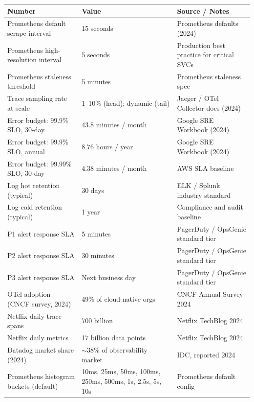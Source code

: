 \documentclass[11pt,a4paper]{article}
\begin{document}
\begin{center}
\small
\begin{tabularx}{\textwidth}{@{}lXX@{}}
\toprule
\textbf{Number} & \textbf{Value} & \textbf{Source / Notes} \\ \midrule
Prometheus default scrape interval       & 15 seconds                           & Prometheus defaults (2024)                \\
Prometheus high-resolution interval      & 5 seconds                            & Production best practice for critical SVCs \\
Prometheus staleness threshold           & 5 minutes                            & Prometheus staleness spec                 \\
Trace sampling rate at scale             & 1--10\% (head); dynamic (tail)       & Jaeger / OTel Collector docs (2024)       \\
Error budget: 99.9\% SLO, 30-day        & 43.8 minutes / month                 & Google SRE Workbook (2024)                \\
Error budget: 99.9\% SLO, annual        & 8.76 hours / year                    & Google SRE Workbook (2024)                \\
Error budget: 99.99\% SLO, 30-day       & 4.38 minutes / month                 & AWS SLA baseline                          \\
Log hot retention (typical)             & 30 days                              & ELK / Splunk industry standard            \\
Log cold retention (typical)            & 1 year                               & Compliance and audit baseline             \\
P1 alert response SLA                   & 5 minutes                            & PagerDuty / OpsGenie standard tier        \\
P2 alert response SLA                   & 30 minutes                           & PagerDuty / OpsGenie standard tier        \\
P3 alert response SLA                   & Next business day                    & PagerDuty / OpsGenie standard tier        \\
OTel adoption (CNCF survey, 2024)       & 49\% of cloud-native orgs            & CNCF Annual Survey 2024                   \\
Netflix daily trace spans               & 700 billion                          & Netflix TechBlog 2024                     \\
Netflix daily metrics                   & 17 billion data points               & Netflix TechBlog 2024                     \\
Datadog market share (2024)             & $\sim$38\% of observability market   & IDC, reported 2024                        \\
Prometheus histogram buckets (default)  & 10ms, 25ms, 50ms, 100ms, 250ms, 500ms, 1s, 2.5s, 5s, 10s & Prometheus default config \\
\bottomrule
\end{tabularx}
\end{center}
\end{document}

